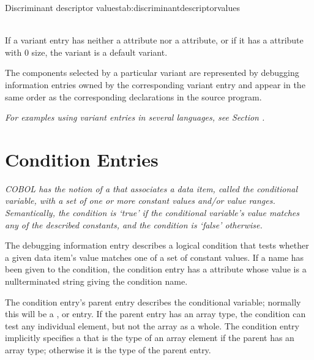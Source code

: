 {\begin{simplenametable}[1.4in]{Discriminant descriptor values}{tab:discriminantdescriptorvalues}
\DWDSClabelTARG{} \\
\DWDSCrangeTARG{} \\
\end{simplenametable}

If a variant entry has neither a \DWATdiscrvalue{}
attribute nor a \DWATdiscrlist{} attribute, or if it has
a \DWATdiscrlist{} attribute with 0 size, the variant is a
default variant.

The components selected by a particular variant are represented
by debugging information entries owned by the corresponding
variant entry and appear in the same order as the corresponding
declarations in the source program.

\bb
\textit{For examples using variant entries in several languages,
see Section .}
\eb

\section{Condition Entries}
\label{chap:conditionentries}

\textit{COBOL has the notion of 
a  that
associates a data item, called the conditional variable, with
a set of one or more constant values and/or value ranges.
Semantically, the condition is \textquoteleft true\textquoteright{}
if the conditional
variable's value matches any of the described constants,
and the condition is \textquoteleft false\textquoteright{} otherwise.}

The \DWTAGconditionTARG{}
debugging information entry
describes a
logical condition that tests whether a given data item\textquoteright s
value matches one of a set of constant values. If a name
has been given to the condition, the condition entry has a
\DWATname{} attribute
whose value is a null\dash terminated string
giving the condition name.

The condition entry's parent entry describes the conditional
variable; normally this will be a \DWTAGvariable,
\DWTAGmember{} or 
\DWTAGformalparameter{} entry.
If 
the parent
entry has an array type, the condition can test any individual
element, but not the array as a whole. The condition entry
implicitly specifies a  that is the
type of an array element if the parent has an array type;
otherwise it is the type of the parent entry.

}

